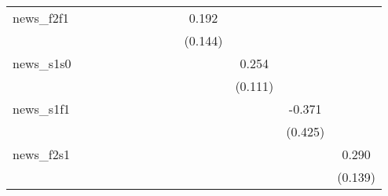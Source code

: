 {\begin{tabular}{l*{12}{c}}
\addlinespace
news\_f2f1   &                     &                     &                     &                     &                     &                     &                     &                     &       0.192         &                     &                     &                     \\
            &                     &                     &                     &                     &                     &                     &                     &                     &     (0.144)         &                     &                     &                     \\
\addlinespace
news\_s1s0   &                     &                     &                     &                     &                     &                     &                     &                     &                     &       0.254\sym{**} &                     &                     \\
            &                     &                     &                     &                     &                     &                     &                     &                     &                     &     (0.111)         &                     &                     \\
\addlinespace
news\_s1f1   &                     &                     &                     &                     &                     &                     &                     &                     &                     &                     &      -0.371         &                     \\
            &                     &                     &                     &                     &                     &                     &                     &                     &                     &                     &     (0.425)         &                     \\
\addlinespace
news\_f2s1   &                     &                     &                     &                     &                     &                     &                     &                     &                     &                     &                     &       0.290\sym{**} \\
            &                     &                     &                     &                     &                     &                     &                     &                     &                     &                     &                     &     (0.139)         \\

\end{tabular}}
